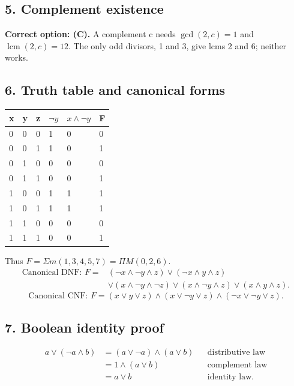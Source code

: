 \documentclass[11pt,a4paper]{article}
\begin{document}
\noindent\begin{minipage}{\linewidth}\subsection*{5. Complement existence}
\textbf{Correct option: (C).} A complement c needs $\gcd(2,c)=1$ and $\operatorname{lcm}(2,c)=12$. The only odd divisors, 1 and 3, give lcms 2 and 6; neither works.
\end{minipage}\par\medskip
\noindent\begin{minipage}{\linewidth}\subsection*{6. Truth table and canonical forms}
\begin{center}\renewcommand{\arraystretch}{1.2}\begin{tabular}{llllll}\hline x & y & z & $\neg y$ & $x\land\neg y$ & F\\\hline
0 & 0 & 0 & 1 & 0 & 0\\
0 & 0 & 1 & 1 & 0 & 1\\
0 & 1 & 0 & 0 & 0 & 0\\
0 & 1 & 1 & 0 & 0 & 1\\
1 & 0 & 0 & 1 & 1 & 1\\
1 & 0 & 1 & 1 & 1 & 1\\
1 & 1 & 0 & 0 & 0 & 0\\
1 & 1 & 1 & 0 & 0 & 1\\\hline\end{tabular}\end{center}
Thus $F=\Sigma m(1,3,4,5,7)=\Pi M(0,2,6)$.
\begin{align*}
\text{Canonical DNF: }F={}&(\neg x\land\neg y\land z)\lor(\neg x\land y\land z)\\
&\lor(x\land\neg y\land\neg z)\lor(x\land\neg y\land z)\lor(x\land y\land z).
\end{align*}
\[\text{Canonical CNF: }F=(x\lor y\lor z)\land(x\lor\neg y\lor z)\land(\neg x\lor\neg y\lor z).\]
\end{minipage}\par\medskip
\noindent\begin{minipage}{\linewidth}\subsection*{7. Boolean identity proof}

\begin{align*}
a\lor(\neg a\land b)
&=(a\lor\neg a)\land(a\lor b)&&\text{distributive law}\\
&=1\land(a\lor b)&&\text{complement law}\\
&=a\lor b&&\text{identity law}.
\end{align*}
\end{minipage}\par\medskip
\end{document}
